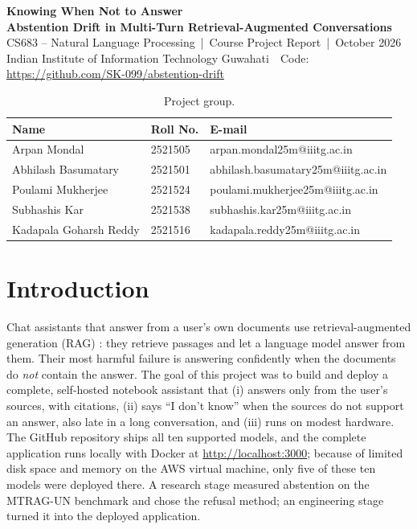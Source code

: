 \documentclass[10pt]{article}
\begin{document}
\begin{center}
{\LARGE\bfseries Knowing When Not to Answer}\\[3pt]
{\large\bfseries Abstention Drift in Multi-Turn Retrieval-Augmented Conversations}\\[4pt]
{\small CS683 -- Natural Language Processing \,|\, Course Project Report \,|\, October 2026}\\[2pt]
{\small Indian Institute of Information Technology Guwahati \,\textbullet\, Code: \url{https://github.com/SK-099/abstention-drift}}
\end{center}
\vspace{-4pt}
\begin{table}[H]
\centering\small
\begin{tabular}{@{}lll@{}}
\toprule
Name & Roll No. & E-mail \\
\midrule
Arpan Mondal & 2521505 & arpan.mondal25m@iiitg.ac.in \\
Abhilash Basumatary & 2521501 & abhilash.basumatary25m@iiitg.ac.in \\
Poulami Mukherjee & 2521524 & poulami.mukherjee25m@iiitg.ac.in \\
Subhashis Kar & 2521538 & subhashis.kar25m@iiitg.ac.in \\
Kadapala Goharsh Reddy & 2521516 & kadapala.reddy25m@iiitg.ac.in \\
\bottomrule
\end{tabular}
\caption{Project group.}
\end{table}
\vspace{-10pt}

\section{Introduction}
Chat assistants that answer from a user's own documents use retrieval-augmented generation (RAG) \cite{rag}: they retrieve passages and let a language model answer from them. Their most harmful failure is answering confidently when the documents do \emph{not} contain the answer. The goal of this project was to build and deploy a complete, self-hosted notebook assistant that (i) answers only from the user's sources, with citations, (ii) says ``I don't know'' when the sources do not support an answer, also late in a long conversation, and (iii) runs on modest hardware. The GitHub repository ships all ten supported models, and the complete application runs locally with Docker at \url{http://localhost:3000}; because of limited disk space and memory on the AWS virtual machine, only five of these ten models were deployed there. A research stage measured abstention on the MTRAG-UN benchmark and chose the refusal method; an engineering stage turned it into the deployed application.
\end{document}
